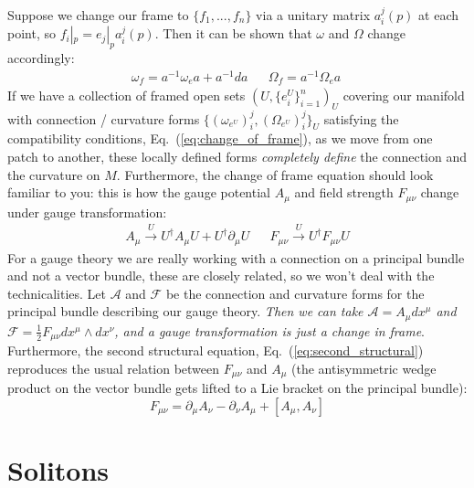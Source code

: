 \documentclass[11pt, oneside]{article}   	%
\theoremstyle{definition}
\newenvironment{answer}{\begin{center}\begin{answerbox}}{\end{answerbox}\end{center}}
\begin{document}
\begin{answer}
\begin{flushleft}
	Suppose we change our frame to $\{f_1, ..., f_n\}$ via a unitary matrix $a_i^j(p)$ at each point, so $f_i|_p = e_j|_pa_i^j(p)$. Then it can 
	be shown that $\omega$ and $\Omega$ change accordingly:
	\begin{align}
		\omega_f = a^{-1} \omega_e a + a^{-1} da && \Omega_f = a^{-1} \Omega_e a~
		\label{eq:change_of_frame}
	\end{align}
	If we have a collection of framed open sets $(U, \{e^U_i\}_{i = 1}^n)_U$ covering our manifold with connection / curvature forms 
	$\{(\omega_{e^U})_i^j, (\Omega_{e^U})_i^j\}_U$ satisfying the compatibility conditions, Eq.~(\ref{eq:change_of_frame}), as we move 
	from one patch to another, these locally defined forms \textit{completely define} the connection and the curvature on $M$. 
	Furthermore, the change of frame equation should look familiar to you: this is how the gauge potential $A_\mu$ and field strength 
	$F_{\mu\nu}$ change under gauge transformation:
	\begin{align}
		A_\mu\xrightarrow{U} U^\dagger A_\mu U + U^\dagger \partial_\mu U && F_{\mu\nu}\xrightarrow{U} U^\dagger F_{\mu\nu} U
	\end{align}
	For a gauge theory we are really working with a connection on a principal bundle and not a vector bundle, these are closely 
	related, so we won't deal with the technicalities. Let $\mathcal A$ and $\mathcal F$ be the connection and curvature forms 
	for the principal bundle describing our gauge theory. \textit{Then we can take $\mathcal A = A_\mu dx^\mu$ and $\mathcal F = 
	\frac{1}{2}F_{\mu\nu}dx^\mu\wedge dx^\nu$, and a gauge transformation is just a change in frame}. Furthermore, the second 
	structural equation, Eq.~(\ref{eq:second_structural}) reproduces the usual relation between $F_{\mu\nu}$ and $A_\mu$ (the 
	antisymmetric wedge product on the vector bundle gets lifted to a Lie bracket on the principal bundle):
	\begin{equation}
		F_{\mu\nu} = \partial_\mu A_\nu - \partial_\nu A_\mu + [A_\mu, A_\nu]
	\end{equation}
	
	\end{flushleft}
\end{answer}

\newpage
\section{Solitons}
\end{document}
